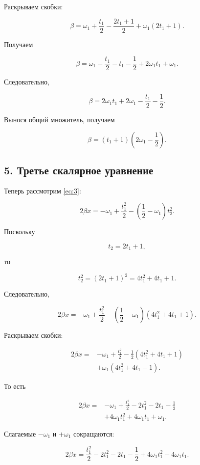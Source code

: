 \documentclass[a4paper,12pt]{article}
\begin{document}
	Раскрываем скобки:
	
	\[
	\beta
	=
	\omega_1+\frac{t_1}{2}
	-\frac{2t_1+1}{2}
	+\omega_1(2t_1+1).
	\]
	
	Получаем
	
	\[
	\beta
	=
	\omega_1+\frac{t_1}{2}
	-t_1-\frac12
	+2\omega_1t_1+\omega_1.
	\]
	
	Следовательно,
	
	\[
	\beta
	=
	2\omega_1t_1+2\omega_1
	-\frac{t_1}{2}-\frac12.
	\]
	
	Вынося общий множитель, получаем
	
	\begin{equation}
		\boxed{
			\beta
			=
			(t_1+1)
			\left(
			2\omega_1-\frac12
			\right).
		}
		\label{eq:beta}
	\end{equation}
	
	\subsection*{5. Третье скалярное уравнение}
	
	Теперь рассмотрим \eqref{eq:3}:
	
	\[
	2\beta x
	=
	-\omega_1
	+\frac{t_1^2}{2}
	-
	\left(\frac12-\omega_1\right)t_2^2.
	\]
	
	Поскольку
	
	\[
	t_2=2t_1+1,
	\]
	
	то
	
	\[
	t_2^2=(2t_1+1)^2
	=
	4t_1^2+4t_1+1.
	\]
	
	Следовательно,
	
	\[
	2\beta x
	=
	-\omega_1
	+\frac{t_1^2}{2}
	-
	\left(\frac12-\omega_1\right)
	(4t_1^2+4t_1+1).
	\]
	
	Раскрываем скобки:
	
	\begin{align*}
		2\beta x
		={}&
		-\omega_1+\frac{t_1^2}{2}
		-\frac12(4t_1^2+4t_1+1)
		\\
		&+
		\omega_1(4t_1^2+4t_1+1).
	\end{align*}
	
	То есть
	
	\begin{align*}
		2\beta x
		={}&
		-\omega_1+\frac{t_1^2}{2}
		-2t_1^2-2t_1-\frac12
		\\
		&+
		4\omega_1t_1^2+4\omega_1t_1+\omega_1.
	\end{align*}
	
	Слагаемые $-\omega_1$ и $+\omega_1$ сокращаются:
	
	\[
	2\beta x
	=
	\frac{t_1^2}{2}
	-2t_1^2
	-2t_1
	-\frac12
	+
	4\omega_1t_1^2
	+
	4\omega_1t_1.
	\]
	
\end{document}
